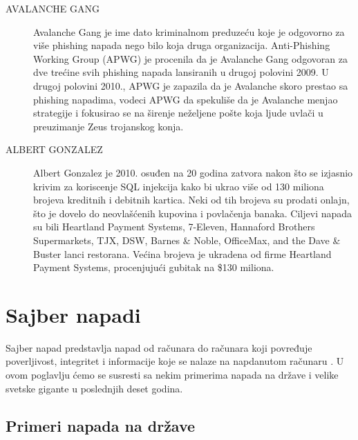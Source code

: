 \documentclass[a4paper]{article}
\begin{document}
\begin{description}
\item[AVALANCHE GANG] Avalanche Gang je ime dato kriminalnom preduzeću koje je odgovorno za više phishing napada nego bilo koja druga organizacija. Anti-Phishing Working Group (APWG) je procenila da je Avalanche Gang odgovoran za dve trećine svih phishing napada lansiranih u drugoj polovini 2009. U drugoj polovini 2010., APWG je zapazila da je Avalanche skoro prestao sa phishing napadima, vodeci APWG da spekuliše da je Avalanche menjao strategije i fokusirao se na širenje neželjene pošte koja ljude uvlači u preuzimanje Zeus trojanskog konja.
\item[ALBERT GONZALEZ] Albert Gonzalez je 2010. osuđen na 20 godina zatvora nakon što se izjasnio krivim za koriscenje SQL injekcija kako bi ukrao više od 130 miliona brojeva kreditnih i debitnih kartica. Neki od tih brojeva su prodati onlajn, što je dovelo do neovlašćenih kupovina i povlačenja banaka. Ciljevi napada su bili Heartland Payment Systems,  7-Eleven,  Hannaford Brothers Supermarkets,  TJX,  DSW,  Barnes \& Noble, OfficeMax, and the Dave \& Buster lanci restorana. Većina brojeva je ukradena od firme Heartland Payment Systems, procenjujući gubitak na \$130 miliona.
\end{description}

\section{Sajber napadi}
\label{sec:sajber_napadi}

Sajber napad predstavlja napad od računara do računara koji povređuje poverljivost, integritet i informacije koje se nalaze na napdanutom računaru \cite{knjiga}. U ovom poglavlju ćemo se susresti sa nekim primerima napada na države i velike svetske gigante u poslednjih deset godina. 

\subsection{Primeri napada na države}
\label{subsec:primeri_napada_drzave}
\end{document}
